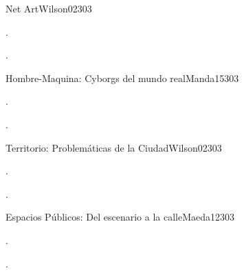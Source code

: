 \begin{syllabus}
\begin{unit}{Net Art}{}{Wilson02}{30}{3}
   \begin{topics}
      \item .
   \end{topics}

   \begin{learningoutcomes}
      \item . 
   \end{learningoutcomes}
\end{unit}

\begin{unit}{Hombre-Maquina: Cyborgs del mundo real}{}{Manda15}{30}{3}
   \begin{topics}
      \item . 
   \end{topics}

   \begin{learningoutcomes}
      \item . 
   \end{learningoutcomes}
\end{unit}

\begin{unit}{Territorio: Problemáticas de la Ciudad}{}{Wilson02}{30}{3}
   \begin{topics}
      \item .
   \end{topics}

   \begin{learningoutcomes}
      \item .
   \end{learningoutcomes}
\end{unit}

\begin{unit}{Espacios Públicos: Del escenario a la calle}{}{Maeda12}{30}{3}
   \begin{topics}
      \item . 
   \end{topics}

   \begin{learningoutcomes}
      \item .
   \end{learningoutcomes}
\end{unit}


\begin{coursebibliography}
\end{coursebibliography}
\end{syllabus}
